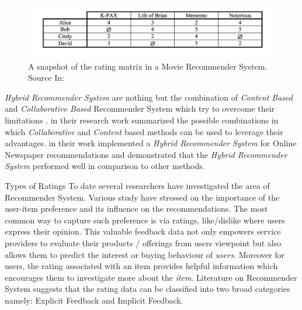 \begin{figure}
    \centering
\includegraphics[scale=0.5]{chapters/figures/Rating Matrix.png}
    \caption{A snapshot of the rating matrix in a Movie Recommender System.  \\
    Source In: \textcite[735]{Adomavicius2005}}
    \label{fig:rating_matrix}
\end{figure}

\emph{Hybrid Recommender System} are nothing but the combination of \emph{Content Based} and \emph{Collaborative Based} Recommender System which try to overcome their limitations \autocite[2]{Claypool1999CombiningCA}.\textcite[740]{Adomavicius2005} in their research work summarized the possible combinations in which \emph{Collaborative} and \emph{Content} based methods can be used to leverage their advantages. \textcite[5]{Claypool1999CombiningCA} in their work implemented a \emph{Hybrid Recommender System} for Online Newspaper recommendations and demonstrated that the \emph{Hybrid Recommender System} performed well in comparison to other methods. \\ \par

Types of Ratings
To date several researchers have investigated the area of Recommender System. Various study have stressed on the importance of the user-item preference and its influence on the recommendations. The most common way to capture such preference is via ratings, like/dislike  where users express their opinion. This valuable feedback data not only empowers service providers to evaluate their products / offerings from users viewpoint but also allows them to predict the interest or buying behaviour of \emph{users}. Moreover for users, the rating associated with an item provides helpful information which encourages them to investigate more about the \emph{item}. Literature on Recommender System suggests that the rating data can be classified into two broad categories namely: Explicit Feedback and Implicit Feedback\autocite[796]{Lak2014}.

